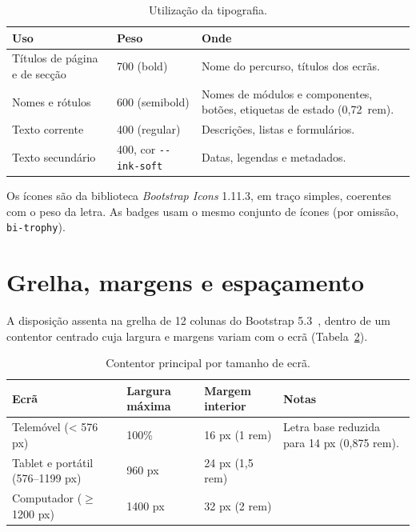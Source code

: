 \begin{table}[H]
    \centering
    \small
    \begin{tabularx}{\linewidth}{llX}
        \toprule
        \textbf{Uso} & \textbf{Peso} & \textbf{Onde} \\
        \midrule
        Títulos de página e de secção & 700 (bold) & Nome do percurso, títulos dos ecrãs. \\
        Nomes e rótulos & 600 (semibold) & Nomes de módulos e componentes, botões, etiquetas de estado (0,72~rem). \\
        Texto corrente & 400 (regular) & Descrições, listas e formulários. \\
        Texto secundário & 400, cor \texttt{-{}-ink-soft} & Datas, legendas e metadados. \\
        \bottomrule
    \end{tabularx}
    \caption{Utilização da tipografia.}
    \label{tab:tipografia}
\end{table}

Os ícones são da biblioteca \emph{Bootstrap Icons} 1.11.3, em traço simples, coerentes com o peso da letra. As badges usam o mesmo conjunto de ícones (por omissão, \texttt{bi-trophy}).

\section{Grelha, margens e espaçamento}

A disposição assenta na grelha de 12 colunas do Bootstrap 5.3~\citep{bootstrap-grid}, dentro de um contentor centrado cuja largura e margens variam com o ecrã (Tabela~\ref{tab:grelha}).

\begin{table}[H]
    \centering
    \small
    \begin{tabularx}{\linewidth}{lllX}
        \toprule
        \textbf{Ecrã} & \textbf{Largura máxima} & \textbf{Margem interior} & \textbf{Notas} \\
        \midrule
        Telemóvel (< 576 px) & 100\% & 16 px (1 rem) & Letra base reduzida para 14 px (0,875 rem). \\
        Tablet e portátil (576--1199 px) & 960 px & 24 px (1,5 rem) & \\
        Computador ($\geq$ 1200 px) & 1400 px & 32 px (2 rem) & \\
        \bottomrule
    \end{tabularx}
    \caption{Contentor principal por tamanho de ecrã.}
    \label{tab:grelha}
\end{table}

